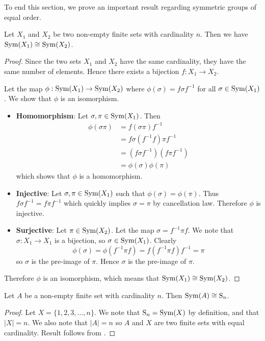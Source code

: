 To end this section, we prove an important result regarding symmetric groups of equal order.
\begin{theorem}\label{thrm-symmetric-groups-of-same-order-are-isomorphic}
    Let $X_1$ and $X_2$ be two non-empty finite sets with cardinality $n$. Then we have $\mathrm{Sym}(X_1) \cong \mathrm{Sym}(X_2)$.
\end{theorem}
\begin{proof}
    Since the two sets $X_1$ and $X_2$ have the same cardinality, they have the same number of elements. Hence there exists a bijection $f: X_1 \to X_2$.

    Let the map $\phi: \mathrm{Sym}(X_1) \to \mathrm{Sym}(X_2)$ where $\phi(\sigma) = f\sigma f^{-1}$ for all $\sigma \in \mathrm{Sym}(X_1)$. We show that $\phi$ is an isomorphism.
    \begin{itemize}
        \item \textbf{Homomorphism}: Let $\sigma, \pi \in \mathrm{Sym}(X_1)$. Then
        \begin{align*}
            \phi(\sigma\pi) &= f(\sigma\pi)f^{-1}\\
            &= f\sigma(f^{-1}f)\pi f^{-1}\\
            &= (f\sigma f^{-1})(f\pi f^{-1})\\
            &= \phi(\sigma)\phi(\pi)
        \end{align*}
        which shows that $\phi$ is a homomorphism.

        \item \textbf{Injective}: Let $\sigma, \pi \in \mathrm{Sym}(X_1)$ such that $\phi(\sigma) = \phi(\pi)$. Thus $f\sigma f^{-1} = f\pi f^{-1}$ which quickly implies $\sigma = \pi$ by cancellation law. Therefore $\phi$ is injective.

        \item \textbf{Surjective}: Let $\pi \in \mathrm{Sym}(X_2)$. Let the map $\sigma = f^{-1}\pi f$. We note that $\sigma: X_1 \to X_1$ is a bijection, so $\sigma \in \mathrm{Sym}(X_1)$. Clearly
        \[
            \phi(\sigma) = \phi(f^{-1}\pi f) = f(f^{-1}\pi f)f^{-1} = \pi
        \]
        so $\sigma$ is the pre-image of $\pi$. Hence $\sigma$ is the pre-image of $\pi$.
    \end{itemize}
    Therefore $\phi$ is an isomorphism, which means that $\mathrm{Sym}(X_1) \cong \mathrm{Sym}(X_2)$.
\end{proof}

\begin{corollary}\label{corollary-symmetric-group-of-finite-order}
    Let $A$ be a non-empty finite set with cardinality $n$. Then $\mathrm{Sym}(A) \cong \mathrm{S}_{n}$.
\end{corollary}
\begin{proof}
    Let $X = \{1, 2, 3, \dots, n\}$. We note that $\mathrm{S}_{n} = \mathrm{Sym}(X)$ by definition, and that $|X| = n$. We also note that $|A| = n$ so $A$ and $X$ are two finite sets with equal cardinality. Result follows from .
\end{proof}

